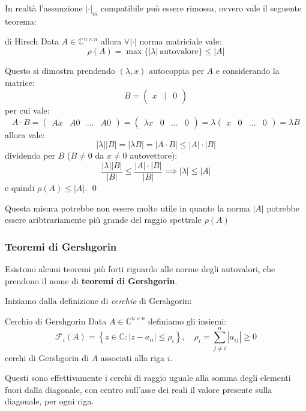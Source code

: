 \documentclass[a4paper,11pt]{article}
\begin{document}
In realtà l'assunzione $|\cdot|_m$ compatibile può essere rimossa, ovvero vale il seguente teorema:
\begin{theorem}{di Hirsch}
	Data $A \in \mathbb{C}^{n \times n}$ allora $\forall |\cdot|$ norma matriciale vale:
	$$
		\rho(A) = \max\{|\lambda| \  \text{autovalore}\} \leq |A|
	$$
\end{theorem}
Questo si dimostra prendendo $(\lambda, x)$ autocoppia per $A$ e considerando la matrice:
$$
B = \begin{pmatrix}
	x & | & 0
\end{pmatrix}
$$
per cui vale:
$$
A \cdot B = \begin{pmatrix}
	Ax & A 0 & ... & A 0
\end{pmatrix} = \begin{pmatrix}
	\lambda x & 0 & ... & 0
\end{pmatrix} = \lambda \begin{pmatrix}
	x & 0 & ... & 0
\end{pmatrix} = \lambda B
$$
allora vale:
$$
|\lambda| |B| = |\lambda B| = |A \cdot B| \leq |A| \cdot |B|
$$
dividendo per $B$ ($B \neq 0$ da $x \neq 0$ autovettore):
$$
\frac{|\lambda| |B|}{|B|} \leq \frac{|A| \cdot |B|}{|B|} \implies |\lambda| \leq |A|
$$
e quindi $\rho(A) \leq |A|$. \qed 

Questa misura potrebbe non essere molto utile in quanto la norma $|A|$ potrebbe essere aribtrariamente più grande del raggio spettrale $\rho(A)$

\subsubsection{Teoremi di Gershgorin}
Esistono alcuni teoremi più forti riguardo alle norme degli autovalori, che prendono il nome di \textbf{teoremi di Gershgorin}.

Iniziamo dalla definizione di \textit{cerchio} di Gershgorin:
\begin{definition}{Cerchio di Gershgorin}
	Data $A \in \mathbb{C}^{n \times n}$ definiamo gli insiemi:
	$$
	\mathcal{F}_i(A) = \left\{ z \in \mathbb{C} : |z - a_{ii}| \leq \rho_i \right\}, \quad \rho_i = \sum_{j \neq i}^n |a_{ij}| \geq 0
	$$
	cerchi di Gershgorin di $A$ associati alla riga $i$.
\end{definition}
Questi sono effettivamente i cerchi di raggio uguale alla somma degli elementi fuori dalla diagonale, con centro sull'asse dei reali il valore presente sulla diagonale, per ogni riga.
\end{document}
